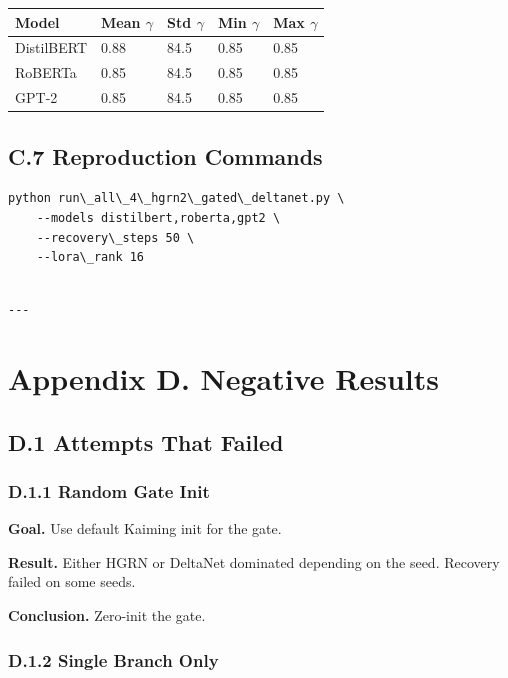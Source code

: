 \begin{table}[H]
\centering
\small
\begin{tabular}{lllll}
\toprule
\textbf{Model} & \textbf{Mean $\gamma$} & \textbf{Std $\gamma$} & \textbf{Min $\gamma$} & \textbf{Max $\gamma$} \\
\midrule
DistilBERT & 0.88 & 84.5 & 0.85 & 0.85 \\
RoBERTa & 0.85 & 84.5 & 0.85 & 0.85 \\
GPT-2 & 0.85 & 84.5 & 0.85 & 0.85 \\
\bottomrule
\end{tabular}
\end{table}

\subsection{C.7 Reproduction Commands}

\begin{lstlisting}
python run\_all\_4\_hgrn2\_gated\_deltanet.py \
    --models distilbert,roberta,gpt2 \
    --recovery\_steps 50 \
    --lora\_rank 16
\end{lstlisting}
\begin{lstlisting}

---
\end{lstlisting}

\section{Appendix D. Negative Results}

\subsection{D.1 Attempts That Failed}

\subsubsection{D.1.1 Random Gate Init}

\textbf{Goal.} Use default Kaiming init for the gate.

\textbf{Result.} Either HGRN or DeltaNet dominated depending on the seed. 
Recovery failed on some seeds.

\textbf{Conclusion.} Zero-init the gate.

\subsubsection{D.1.2 Single Branch Only}


